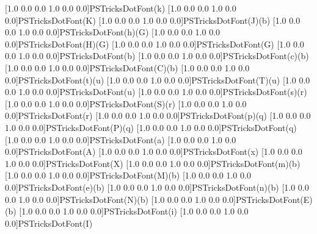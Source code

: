 \iffalse
\newpsfontdot{*}[2.77778 0.0 0.0 2.77778 -0.638889 -0.813889]{Symbol}{<B7>}
\newpsfontdot{o}[3.33333 0.0 0.0 3.33333 -0.666667 -1.78167]{Symbol}{<B0>}
\newpsfontdot{Bo}[4.69484 0.0 0.0 4.69484 -0.78169 -2.97418]{Times-Bold}{<CA>}
\fi
[1.0 0.0 0.0 1.0 0.0 0.0]{PSTricksDotFont}{(k)}
[1.0 0.0 0.0 1.0 0.0 0.0]{PSTricksDotFont}{(K)}
[1.0 0.0 0.0 1.0 0.0 0.0]{PSTricksDotFont}{(J)}{(b)}
[1.0 0.0 0.0 1.0 0.0 0.0]{PSTricksDotFont}{(h)}{(G)}
[1.0 0.0 0.0 1.0 0.0 0.0]{PSTricksDotFont}{(H)}{(G)}
[1.0 0.0 0.0 1.0 0.0 0.0]{PSTricksDotFont}{(G)}
%
[1.0 0.0 0.0 1.0 0.0 0.0]{PSTricksDotFont}{(b)}
[1.0 0.0 0.0 1.0 0.0 0.0]{PSTricksDotFont}{(c)}{(b)}
[1.0 0.0 0.0 1.0 0.0 0.0]{PSTricksDotFont}{(C)}{(b)}
[1.0 0.0 0.0 1.0 0.0 0.0]{PSTricksDotFont}{(t)}{(u)}
[1.0 0.0 0.0 1.0 0.0 0.0]{PSTricksDotFont}{(T)}{(u)}
[1.0 0.0 0.0 1.0 0.0 0.0]{PSTricksDotFont}{(u)}
[1.0 0.0 0.0 1.0 0.0 0.0]{PSTricksDotFont}{(s)}{(r)}
[1.0 0.0 0.0 1.0 0.0 0.0]{PSTricksDotFont}{(S)}{(r)}
[1.0 0.0 0.0 1.0 0.0 0.0]{PSTricksDotFont}{(r)}
[1.0 0.0 0.0 1.0 0.0 0.0]{PSTricksDotFont}{(p)}{(q)}
[1.0 0.0 0.0 1.0 0.0 0.0]{PSTricksDotFont}{(P)}{(q)}
[1.0 0.0 0.0 1.0 0.0 0.0]{PSTricksDotFont}{(q)}
[1.0 0.0 0.0 1.0 0.0 0.0]{PSTricksDotFont}{(a)}
[1.0 0.0 0.0 1.0 0.0 0.0]{PSTricksDotFont}{(A)}
[1.0 0.0 0.0 1.0 0.0 0.0]{PSTricksDotFont}{(x)}
[1.0 0.0 0.0 1.0 0.0 0.0]{PSTricksDotFont}{(X)}
[1.0 0.0 0.0 1.0 0.0 0.0]{PSTricksDotFont}{(m)}{(b)}
[1.0 0.0 0.0 1.0 0.0 0.0]{PSTricksDotFont}{(M)}{(b)}
[1.0 0.0 0.0 1.0 0.0 0.0]{PSTricksDotFont}{(e)}{(b)}
[1.0 0.0 0.0 1.0 0.0 0.0]{PSTricksDotFont}{(n)}{(b)}
[1.0 0.0 0.0 1.0 0.0 0.0]{PSTricksDotFont}{(N)}{(b)}
[1.0 0.0 0.0 1.0 0.0 0.0]{PSTricksDotFont}{(E)}{(b)}
[1.0 0.0 0.0 1.0 0.0 0.0]{PSTricksDotFont}{(i)}
[1.0 0.0 0.0 1.0 0.0 0.0]{PSTricksDotFont}{(I)}
